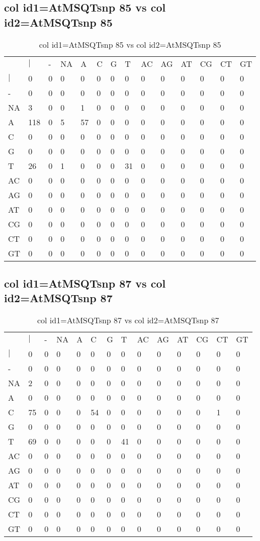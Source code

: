 \subsection{col id1=AtMSQTsnp 85 vs col id2=AtMSQTsnp 85}
\begin{center}
\begin{longtable}{|l|l|l|l|l|l|l|l|l|l|l|l|l|l|}
\caption{col id1=AtMSQTsnp 85 vs col id2=AtMSQTsnp 85} \label{table_dm768}\\
\hline
\\
\hline
&$|$&-&NA&A&C&G&T&AC&AG&AT&CG&CT&GT\\
$|$&0&0&0&0&0&0&0&0&0&0&0&0&0\\
-&0&0&0&0&0&0&0&0&0&0&0&0&0\\
NA&3&0&0&1&0&0&0&0&0&0&0&0&0\\
A&118&0&5&57&0&0&0&0&0&0&0&0&0\\
C&0&0&0&0&0&0&0&0&0&0&0&0&0\\
G&0&0&0&0&0&0&0&0&0&0&0&0&0\\
T&26&0&1&0&0&0&31&0&0&0&0&0&0\\
AC&0&0&0&0&0&0&0&0&0&0&0&0&0\\
AG&0&0&0&0&0&0&0&0&0&0&0&0&0\\
AT&0&0&0&0&0&0&0&0&0&0&0&0&0\\
CG&0&0&0&0&0&0&0&0&0&0&0&0&0\\
CT&0&0&0&0&0&0&0&0&0&0&0&0&0\\
GT&0&0&0&0&0&0&0&0&0&0&0&0&0\\
\hline
\end{longtable}
\end{center}

\subsection{col id1=AtMSQTsnp 87 vs col id2=AtMSQTsnp 87}
\begin{center}
\begin{longtable}{|l|l|l|l|l|l|l|l|l|l|l|l|l|l|}
\caption{col id1=AtMSQTsnp 87 vs col id2=AtMSQTsnp 87} \label{table_dm770}\\
\hline
\\
\hline
&$|$&-&NA&A&C&G&T&AC&AG&AT&CG&CT&GT\\
$|$&0&0&0&0&0&0&0&0&0&0&0&0&0\\
-&0&0&0&0&0&0&0&0&0&0&0&0&0\\
NA&2&0&0&0&0&0&0&0&0&0&0&0&0\\
A&0&0&0&0&0&0&0&0&0&0&0&0&0\\
C&75&0&0&0&54&0&0&0&0&0&0&1&0\\
G&0&0&0&0&0&0&0&0&0&0&0&0&0\\
T&69&0&0&0&0&0&41&0&0&0&0&0&0\\
AC&0&0&0&0&0&0&0&0&0&0&0&0&0\\
AG&0&0&0&0&0&0&0&0&0&0&0&0&0\\
AT&0&0&0&0&0&0&0&0&0&0&0&0&0\\
CG&0&0&0&0&0&0&0&0&0&0&0&0&0\\
CT&0&0&0&0&0&0&0&0&0&0&0&0&0\\
GT&0&0&0&0&0&0&0&0&0&0&0&0&0\\
\hline
\end{longtable}
\end{center}

